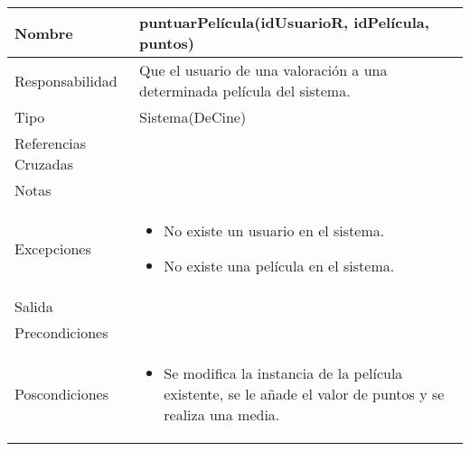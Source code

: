 \documentclass{article}
\begin{document}
\begin{table}[h]
\begin{tabular}{|l|l|l|l|l|l|}
\hline
\multicolumn{2}{|p{3cm}|}{Nombre} & \multicolumn{4}{p{10cm}|}{\textbf{puntuarPelícula(idUsuarioR, idPelícula, puntos)}}\\
\hline
\multicolumn{2}{|p{3cm}|}{Responsabilidad} & \multicolumn{4}{p{10cm}|}{Que el usuario de una valoración a una determinada película del sistema.} \\
\hline
\multicolumn{2}{|p{3cm}|}{Tipo} & \multicolumn{4}{p{10cm}|}{Sistema(DeCine)} \\
\hline
\multicolumn{2}{|p{3cm}|}{Referencias Cruzadas} & \multicolumn{4}{p{10cm}|}{} \\
\hline
\multicolumn{2}{|p{3cm}|}{Notas} & \multicolumn{4}{p{10cm}|}{} \\
\hline
\multicolumn{2}{|p{3cm}|}{Excepciones} & \multicolumn{4}{p{10cm}|}{\begin{itemize}
\item No existe un usuario en el sistema.
\item No existe una película en el sistema.
\end{itemize}} \\
\hline
\multicolumn{2}{|p{3cm}|}{Salida} & \multicolumn{4}{p{10cm}|}{} \\
\hline
\multicolumn{2}{|p{3cm}|}{Precondiciones} & \multicolumn{4}{p{10cm}|}{} \\
\hline
\multicolumn{2}{|p{3cm}|}{Poscondiciones} & \multicolumn{4}{p{10cm}|}{\begin{itemize}
\item Se modifica la instancia de la película existente, se le añade el valor de puntos y se realiza una media.
\end{itemize}} \\
\hline
\end{tabular}
\end{table}
\end{document}

